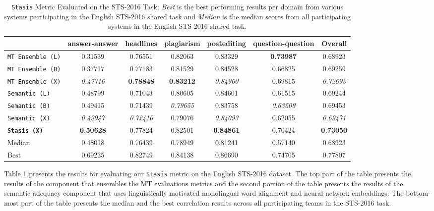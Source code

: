 \begin{table}[H]
\centering
    \begin{tabular}{l|ccccc|c}
            & answer-answer & headlines & plagiarism & postediting & question-question & Overall     \\ \hline
    {\tt MT Ensemble (L)}  & 0.31539       & 0.76551   & 0.82063    & 0.83329     & \textbf{0.73987}           & 0.68923 \\
    {\tt MT Ensemble (B)} & 0.37717       & 0.77183   & 0.81529    & 0.84528     & 0.66825           & 0.69259 \\
    {\tt MT Ensemble (X)} & \textit{0.47716} & \textbf{0.78848} & \textbf{0.83212}    & \textit{0.84960}      & 0.69815           & \textit{0.72693} \\ \hline
   {\tt Semantic (L)} & 0.48799       & 0.71043   & 0.80605    & 0.84601     & 0.61515           & 0.69244 \\
    {\tt Semantic (B)}  & 0.49415       & 0.71439   &\textit{ 0.79655 }   & 0.83758     & \textit{0.63509 }          & 0.69453 \\
    {\tt Semantic (X)}  & \textit{0.49947 }      & \textit{0.72410 }   & 0.79076    & \textit{0.84093}     & 0.62055           & \textit{0.69471} \\ \hline
\textbf{{\tt Stasis (X)}} & \textbf{0.50628} &  0.77824 & 0.82501 &  \textbf{0.84861} & 0.70424 & \textbf{0.73050} \\ \hline
Median & 0.48018 & 0.76439 & 0.78949 & 0.81241 & 0.57140 & 0.68923 \\
Best & 0.69235 & 0.82749 & 0.84138 & 0.86690 & 0.74705 & 0.77807 \\
    \end{tabular}
\caption{{\tt Stasis} Metric Evaluated on the STS-2016 Task;  \textit{Best} is the best performing results per domain from various systems participating in the English STS-2016 shared task and \textit{Median} is the median scores from all participating systems in the English STS-2016 shared task.}
\label{tab:sts1}
\end{table}

Table \ref{tab:sts1} presents the results for evaluating our {\tt Stasis} metric on the English STS-2016 dataset. 
The top part of the table presents the results of the component that ensembles the MT evaluations metrics and the second portion of the table presents the results of the semantic adequacy component that uses linguistically motivated monolingual word alignment and neural network embeddings. The bottom-most part of the table presents the median and the best correlation results across all participating teams in the STS-2016 task.

